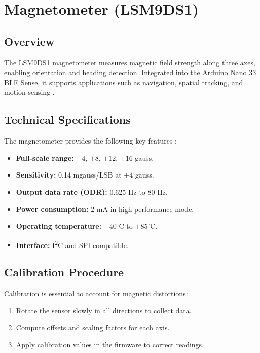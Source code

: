 \section{Magnetometer (LSM9DS1)}

\subsection{Overview}
The LSM9DS1 magnetometer measures magnetic field strength along three axes, enabling orientation and heading detection. Integrated into the Arduino Nano 33 BLE Sense, it supports applications such as navigation, spatial tracking, and motion sensing \cite{Bosch:2024c, STM:2015}.

\subsection{Technical Specifications}
The magnetometer provides the following key features \cite{STM:2015}:
\begin{itemize}
    \item \textbf{Full-scale range:} $\pm4$, $\pm8$, $\pm12$, $\pm16$ gauss.
    \item \textbf{Sensitivity:} 0.14 mgauss/LSB at $\pm4$ gauss.
    \item \textbf{Output data rate (ODR):} 0.625 Hz to 80 Hz.
    \item \textbf{Power consumption:} 2 mA in high-performance mode.
    \item \textbf{Operating temperature:} $-40^{\circ}$C to $+85^{\circ}$C.
    \item \textbf{Interface:} I\textsuperscript{2}C and SPI compatible.
\end{itemize}

\subsection{Calibration Procedure}
Calibration is essential to account for magnetic distortions:
\begin{enumerate}
    \item Rotate the sensor slowly in all directions to collect data.
    \item Compute offsets and scaling factors for each axis.
    \item Apply calibration values in the firmware to correct readings.
\end{enumerate}

